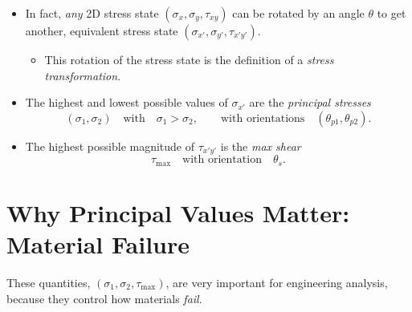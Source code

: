 \documentclass[11pt]{article}
\begin{document}
\bigskip
\begin{itemize}
  \item In fact, \emph{any} 2D stress state $(\sigma_x, \sigma_y, \tau_{xy})$ can be rotated
        by an angle $\theta$ to get another, equivalent stress state
        $(\sigma_{x'}, \sigma_{y'}, \tau_{x'y'})$.
  \begin{itemize}[label=--]
    \item This rotation of the stress state is the definition of a
          \emph{stress transformation}.
  \end{itemize}
  \item The highest and lowest possible values of $\sigma_{x'}$ are the
        \emph{principal stresses}
        \[
          (\sigma_1, \sigma_2) \quad\text{with}\quad \sigma_1 > \sigma_2,
          \qquad\text{with orientations}\quad (\theta_{p1}, \theta_{p2}).
        \]
  \item The highest possible magnitude of $\tau_{x'y'}$ is the \emph{max shear}
        \[
          \tau_{\max} \quad\text{with orientation}\quad \theta_s.
        \]
\end{itemize}

\section*{Why Principal Values Matter: Material Failure}

\noindent
These quantities, $(\sigma_1, \sigma_2, \tau_{\max})$, are very important for
engineering analysis, because they control how materials \emph{fail}.
\end{document}
